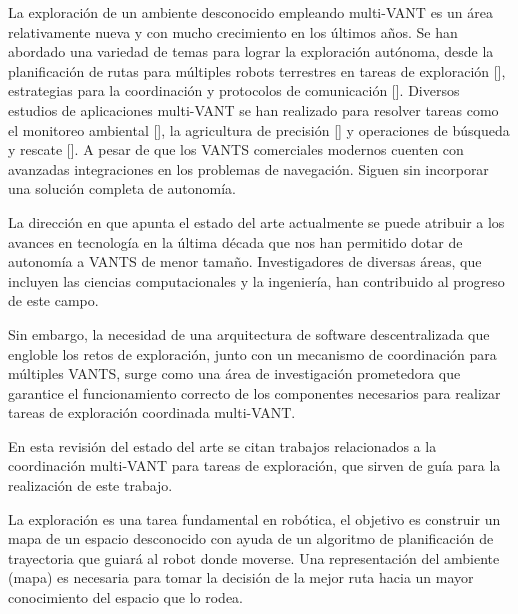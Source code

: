 
La exploraci\'{o}n de un ambiente desconocido empleando multi-VANT es un \'{a}rea relativamente nueva y con mucho crecimiento en los \'{u}ltimos a\~{n}os. Se han abordado una variedad de temas para lograr la exploraci\'{o}n aut\'{o}noma, desde la planificaci\'{o}n de rutas para m\'{u}ltiples robots terrestres en tareas de exploraci\'{o}n [], estrategias para la coordinaci\'{o}n y protocolos de comunicaci\'{o}n []. Diversos estudios de aplicaciones multi-VANT se han realizado para resolver tareas como el monitoreo ambiental [], la agricultura de precisi\'{o}n [] y operaciones de b\'{u}squeda y rescate []. A pesar de que los VANTS comerciales modernos cuenten con avanzadas integraciones en los problemas de navegación. Siguen sin incorporar una solución completa de autonomía.

La direcci\'{o}n en que apunta el estado del arte actualmente se puede atribuir a los avances en tecnolog\'{i}a en la \'{u}ltima d\'{e}cada que nos han permitido dotar de autonomía a VANTS de menor tamaño. Investigadores de diversas \'{a}reas, que incluyen las ciencias computacionales y la ingeniería, han contribuido al progreso de este campo.

Sin embargo, la necesidad de una arquitectura de software descentralizada que engloble los retos de exploración, junto con un mecanismo de coordinación para múltiples VANTS, surge como una área de investigación prometedora que garantice el funcionamiento correcto de los componentes necesarios para realizar tareas de exploración coordinada multi-VANT.

En esta revisión del estado del arte se citan trabajos relacionados a la coordinación multi-VANT para tareas de exploración, que sirven de guía para la realización de este trabajo.


La exploración es una tarea fundamental en robótica, el objetivo es construir un mapa de un espacio desconocido con ayuda de un algoritmo de planificación de trayectoria que guiará al robot donde moverse. Una representación del ambiente (mapa) es necesaria para tomar la decisión de la mejor ruta hacia un mayor conocimiento del espacio que lo rodea.

